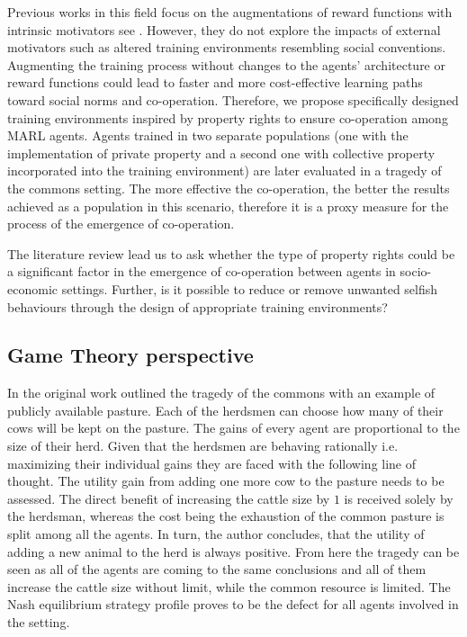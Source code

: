 \documentclass[pdflatex,sn-basic,lineno]{sn-jnl}
\theoremstyle{thmstyleone}%
\theoremstyle{thmstyletwo}%
\theoremstyle{thmstylethree}%
\begin{document}
Previous works in this field focus on the augmentations of reward functions with intrinsic motivators see
\citep{Peysakhovich2017, Perolat2017, Hughes2018, Willis2023a}. However, they do not explore the impacts of
external motivators such as altered training environments resembling social conventions. Augmenting the training process
without changes to the agents’ architecture or reward functions could lead to faster and more cost-effective learning
paths toward social norms and co-operation. Therefore, we propose specifically designed training environments inspired
by property rights to ensure co-operation among MARL agents. Agents trained in two separate populations (one with the
implementation of private property and a second one with collective property incorporated into the training environment)
are later evaluated in a tragedy of the commons setting. The more effective the co-operation, the better the results
achieved as a population in this scenario, therefore it is a proxy measure for the process of the emergence of
co-operation.
 
The literature review lead us to ask whether the type of property rights could be a significant factor in the emergence
of co-operation between agents in socio-economic settings. Further, is it possible to reduce or remove unwanted selfish
behaviours through the design of appropriate training environments?

\subsection{Game Theory perspective}\label{subsec2-game-theory}

In the original work \cite{hardin1968tragedy} outlined the tragedy of the commons with an example of publicly
available pasture. Each of the herdsmen can choose how many of their cows will be kept on the pasture. The gains of
every agent are proportional to the size of their herd. Given that the herdsmen are behaving rationally i.e.
maximizing their individual gains they are faced with the following line of thought. The utility gain from adding one
more cow to the pasture needs to be assessed. The direct benefit of increasing the cattle size by $1$ is received
solely by the herdsman, whereas the cost being the exhaustion of the common pasture is split among all the agents. In
turn, the author concludes, that the utility of adding a new animal to the herd is always positive. From here the
tragedy can be seen as all of the agents are coming to the same conclusions and all of them increase the cattle size
without limit, while the common resource is limited. The Nash equilibrium strategy profile proves to be the defect for
all agents involved in the setting.
\end{document}
